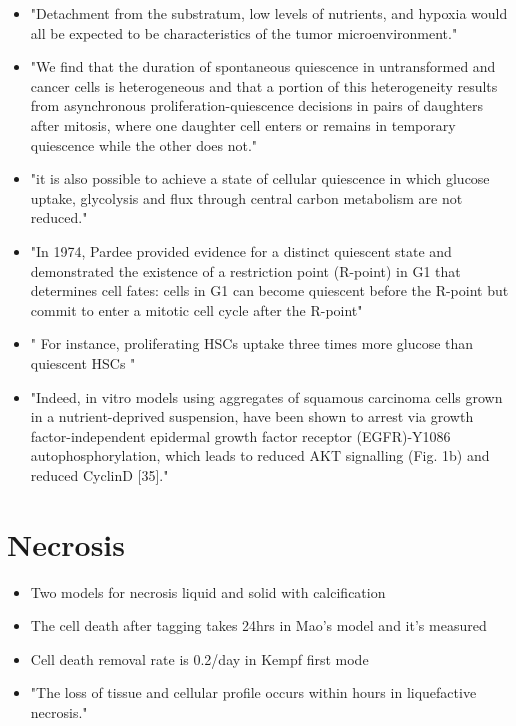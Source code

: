 \documentclass[11pt,a4paper]{article}
\begin{document}
\begin{itemize}
\item "Detachment from the substratum, low levels of nutrients, and hypoxia would all be expected to be characteristics of the tumor microenvironment."\cite{Valcourt2012}
\item  "We find that the duration of spontaneous quiescence in untransformed and cancer cells is heterogeneous and that a portion of this heterogeneity results from asynchronous proliferation-quiescence decisions in pairs of daughters after mitosis, where one daughter cell enters or remains in temporary quiescence while the other does not."\cite{Pulianmackal2021}
\item "it is also possible to achieve a state of cellular quiescence in which glucose uptake, glycolysis and flux through central carbon metabolism are not reduced."\cite{Valcourt2012}
\item "In 1974, Pardee provided evidence for a distinct quiescent state and demonstrated the existence of a restriction point (R-point) in G1 that determines cell fates: cells in G1 can become quiescent before the R-point but commit to enter a mitotic cell cycle after the R-point"\cite{Cheung2013}
\item " For instance, proliferating HSCs uptake three times more glucose than quiescent HSCs " \cite{Marescal2020}
\item "Indeed, in vitro models using aggregates of squamous carcinoma cells grown in a nutrient-deprived suspension, have been shown to arrest via growth factor-independent epidermal growth factor receptor (EGFR)-Y1086 autophosphorylation, which leads to reduced AKT signalling (Fig. 1b) and reduced CyclinD [35]."
\end{itemize}

\section{Necrosis}
\begin{itemize}
\item Two models for necrosis liquid and solid with calcification \cite{Thim2010}\cite{YuMi2017}
\item The cell death after tagging takes 24hrs in Mao's model and it's measured \cite{Mao2018}
\item Cell death removal rate is 0.2/day in Kempf first mode \cite{Kempf2005}
\item "The loss of tissue and cellular profile occurs within hours in liquefactive necrosis." \cite{Adigun2024}
\end{itemize} 
\end{document}
